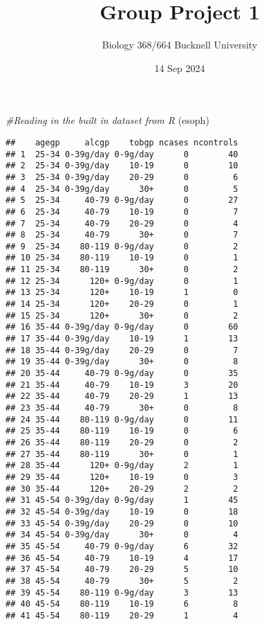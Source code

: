 \documentclass[
]{article}
\title{Group Project 1}
\subtitle{Biology 368/664 Bucknell University}
\author{}
\date{\vspace{-2.5em}14 Sep 2024}
\newenvironment{Shaded}{\begin{snugshade}}{\end{snugshade}}
\newcommand{\CommentTok}[1]{\textcolor[rgb]{0.56,0.35,0.01}{\textit{#1}}}
\newcommand{\NormalTok}[1]{#1}
\begin{document}
\maketitle

\begin{Shaded}
\begin{Highlighting}[]
\CommentTok{\#Reading in the built in dataset from R}
\NormalTok{(esoph)}
\end{Highlighting}
\end{Shaded}

\begin{verbatim}
##    agegp     alcgp    tobgp ncases ncontrols
## 1  25-34 0-39g/day 0-9g/day      0        40
## 2  25-34 0-39g/day    10-19      0        10
## 3  25-34 0-39g/day    20-29      0         6
## 4  25-34 0-39g/day      30+      0         5
## 5  25-34     40-79 0-9g/day      0        27
## 6  25-34     40-79    10-19      0         7
## 7  25-34     40-79    20-29      0         4
## 8  25-34     40-79      30+      0         7
## 9  25-34    80-119 0-9g/day      0         2
## 10 25-34    80-119    10-19      0         1
## 11 25-34    80-119      30+      0         2
## 12 25-34      120+ 0-9g/day      0         1
## 13 25-34      120+    10-19      1         0
## 14 25-34      120+    20-29      0         1
## 15 25-34      120+      30+      0         2
## 16 35-44 0-39g/day 0-9g/day      0        60
## 17 35-44 0-39g/day    10-19      1        13
## 18 35-44 0-39g/day    20-29      0         7
## 19 35-44 0-39g/day      30+      0         8
## 20 35-44     40-79 0-9g/day      0        35
## 21 35-44     40-79    10-19      3        20
## 22 35-44     40-79    20-29      1        13
## 23 35-44     40-79      30+      0         8
## 24 35-44    80-119 0-9g/day      0        11
## 25 35-44    80-119    10-19      0         6
## 26 35-44    80-119    20-29      0         2
## 27 35-44    80-119      30+      0         1
## 28 35-44      120+ 0-9g/day      2         1
## 29 35-44      120+    10-19      0         3
## 30 35-44      120+    20-29      2         2
## 31 45-54 0-39g/day 0-9g/day      1        45
## 32 45-54 0-39g/day    10-19      0        18
## 33 45-54 0-39g/day    20-29      0        10
## 34 45-54 0-39g/day      30+      0         4
## 35 45-54     40-79 0-9g/day      6        32
## 36 45-54     40-79    10-19      4        17
## 37 45-54     40-79    20-29      5        10
## 38 45-54     40-79      30+      5         2
## 39 45-54    80-119 0-9g/day      3        13
## 40 45-54    80-119    10-19      6         8
## 41 45-54    80-119    20-29      1         4

\end{verbatim}
\end{document}
